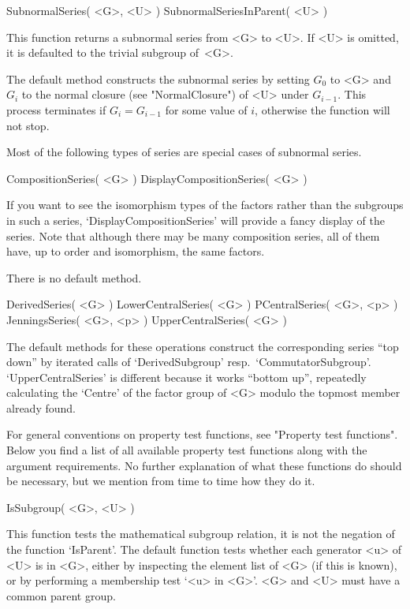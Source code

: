 \>SubnormalSeries( <G>, <U> )
\>SubnormalSeriesInParent( <U> )

This function returns  a  subnormal series from  <G> to  <U>. If <U>   is
omitted, it is defaulted to the trivial subgroup of~<G>.

The default method constructs  the subnormal series  by setting  $G_0$ to
<G> and $G_i$ to  the normal closure (see  "NormalClosure") of  <U> under
$G_{i-1}$. This  process terminates if   $G_i=G_{i-1}$ for some  value of
$i$, otherwise the function will not stop.

Most  of the  following types  of  series are special  cases of subnormal
series.

\>CompositionSeries( <G> )
\>DisplayCompositionSeries( <G> )

If you want to see  the isomorphism types of  the factors rather than the
subgroups  in  such a series,  `DisplayCompositionSeries'  will provide a
fancy display of the   series.  Note that  although   there may  be  many
composition  series, all of them  have, up to  order and isomorphism, the
same factors.

There is no default method.

\>DerivedSeries( <G> )
\>LowerCentralSeries( <G> )
\>PCentralSeries( <G>, <p> )
\>JenningsSeries( <G>, <p> )
\>UpperCentralSeries( <G> )

The default  methods  for  these operations  construct  the corresponding
series   ``top    down''  by     iterated calls    of   `DerivedSubgroup'
resp.~`CommutatorSubgroup'.  `UpperCentralSeries' is different because it
works ``bottom  up'', repeatedly calculating the  `Centre' of  the factor
group of <G> modulo the topmost member already found.


For general  conventions on property  test  functions, see "Property test
functions".   Below  you find a  list    of all  available property  test
functions along with the argument requirements. No further explanation of
what these functions do should be necessary, but we  mention from time to
time how they do it.

\>IsSubgroup( <G>, <U> )

This function  tests the mathematical  subgroup  relation, it is not  the
negation of the {\GAP}  function `IsParent'.  The default function  tests
whether each generator <u>  of <U> is  in <G>,  either by inspecting  the
element list of <G> (if  this is  known),  or by performing a  membership
test `<u> in <G>'.  <G> and <U> must have a common parent group.

